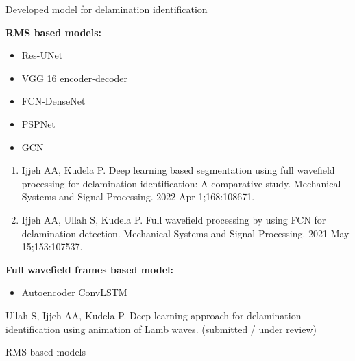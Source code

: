 \documentclass[10pt,aspectratio=169]{beamer} %
\begin{document}
\begin{frame}{Developed model for delamination identification}
	\begin{minipage}[t]{0.45\textwidth}
		\textbf{RMS based models: \\}
			\begin{itemize}
				\item Res-UNet
				\item VGG 16 encoder-decoder
				\item FCN-DenseNet
				\item PSPNet
				\item GCN
			\end{itemize}
		{\tiny  
			\begin{enumerate}
				\item Ijjeh AA, Kudela P. Deep learning based segmentation using full wavefield processing for delamination identification: A comparative study. Mechanical Systems and Signal Processing. 2022 Apr 1;168:108671.
				\item Ijjeh AA, Ullah S, Kudela P. Full wavefield processing by using FCN for delamination detection. Mechanical Systems and Signal Processing. 2021 May 15;153:107537.
				
			\end{enumerate}}	
	\end{minipage}
	\hfill
	\begin{minipage}[t]{.45\textwidth}
	\textbf{Full wavefield frames based model:}
		\begin{itemize}
			\item Autoencoder ConvLSTM
		\end{itemize}
	\tiny
	\item Ullah S, Ijjeh AA, Kudela P. Deep learning approach for delamination identification using animation of Lamb waves. (submitted / under review)
	\end{minipage}
\end{frame}
\setcounter{subfigure}{0}
\begin{frame}{RMS based models}
	\begin{minipage}[c]{0.55\textwidth}
		\begin{figure}
		\end{figure}
	\end{minipage}
	\begin{minipage}[c]{0.35\textwidth}
		\begin{figure}
\end{figure}
	\end{minipage}

\end{frame}
\end{document}
